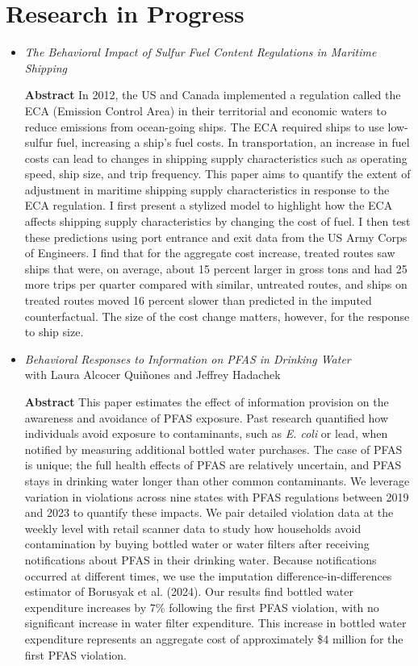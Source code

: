 \documentclass{article}[12]
\begin{document}
\section{Research in Progress}
\begin{itemize}
    \item \textit{The Behavioral Impact of Sulfur Fuel Content Regulations in Maritime Shipping}

\textbf{Abstract} In 2012, the US and Canada implemented a regulation called the ECA (Emission Control Area) in their territorial and economic waters to reduce emissions from ocean-going ships. The ECA required ships to use low-sulfur fuel, increasing a ship’s fuel costs. In transportation, an increase in fuel costs can lead to changes in shipping supply characteristics such as operating speed, ship size, and trip frequency. This paper aims to quantify the extent of adjustment in maritime shipping supply characteristics in response to the ECA regulation. I first present a stylized model to highlight how the ECA affects shipping supply characteristics by changing the cost of fuel. I then test these predictions using port entrance and exit data from the US Army Corps of Engineers. I find that for the aggregate cost increase, treated routes saw ships that were, on average, about 15 percent larger in gross tons and had 25 more trips per quarter compared with similar, untreated routes, and ships on treated routes moved 16 percent slower than predicted in the imputed counterfactual. The size of the cost change matters, however, for the response to ship size. 
    \\
    \item \textit{Behavioral Responses to Information on PFAS in Drinking Water} \\ with Laura Alcocer Qui\~nones and Jeffrey Hadachek 

\textbf{Abstract} This paper estimates the effect of information provision on the awareness and avoidance of PFAS exposure. Past research quantified how individuals avoid exposure to contaminants, such as \textit{E. coli} or lead, when notified by measuring additional bottled water purchases. The case of PFAS is unique; the full health effects of PFAS are relatively uncertain, and PFAS stays in drinking water longer than other common contaminants. We leverage variation in violations across nine states with PFAS regulations between 2019 and 2023 to quantify these impacts. We pair detailed violation data at the weekly level with retail scanner data to study how households avoid contamination by buying bottled water or water filters after receiving notifications about PFAS in their drinking water. Because notifications occurred at different times, we use the imputation difference-in-differences estimator of Borusyak et al. (2024). Our results find bottled water expenditure increases by 7\% following the first PFAS violation, with no significant increase in water filter expenditure. This increase in bottled water expenditure represents an aggregate cost of approximately \$4 million for the first PFAS violation. 
\end{itemize}
\end{document}
